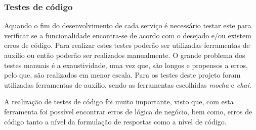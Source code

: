 \subsubsection{Testes de código}
Aquando o fim do desenvolvimento de cada serviço é necessário testar este para verificar se a funcionalidade encontra-se de acordo com o desejado e/ou existem erros de código. Para realizar estes testes poderão ser utilizadas ferramentas de auxílio ou então poderão ser realizados manualmente. O grande problema dos testes manuais é a exaustividade, uma vez que, são longos e propensos a erros, pelo que, são realizados em menor escala. Para os testes deste projeto foram utilizadas ferramentas de auxílio, sendo as ferramentas escolhidas \textit{mocha} e \textit{chai}.



A realização de testes de código foi muito importante, visto que, com esta ferramenta foi possível encontrar erros de lógica de negócio, bem como, erros de código tanto a nível da formulação de respostas como a nível de código.



